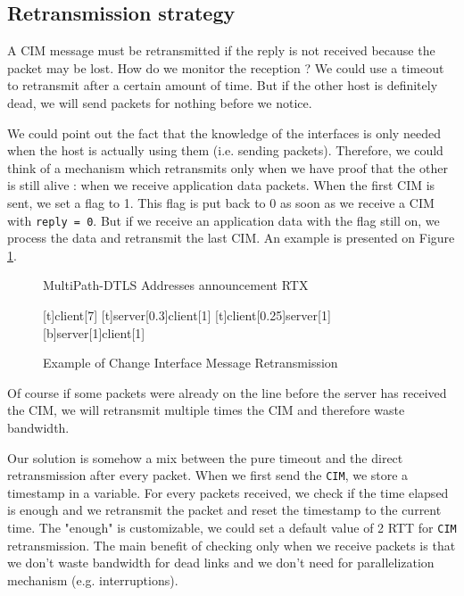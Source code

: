 \subsection{Retransmission strategy}


A CIM message must be retransmitted if the reply is not received because the packet may be lost. How do we monitor the reception ? We could use a timeout to retransmit after a certain amount of time. But if the other host is definitely dead, we will send packets for nothing before we notice.

We could point out the fact that the knowledge of the interfaces is only needed when the host is actually using them (i.e. sending packets). Therefore, we could think of a mechanism which retransmits only when we have proof that the other is still alive : when we receive application data packets. When the first CIM is sent, we set a flag to 1. This flag is put back to 0 as soon as we receive a CIM with \verb$reply = 0$. But if we receive an application data with the flag still on, we process the data and retransmit the last CIM. An example is presented on Figure \ref{fig:CIMexchange2}.

\begin{figure}[!h]
\centering
\begin{msc}[r]{MultiPath-DTLS Addresses announcement RTX}

\setlength{\instfootheight}{0em}
\setlength{\instheadheight}{0em}
\setlength{\instdist}{0.7\linewidth}
\setlength{\levelheight}{3em}


[t]{}{client}[7]
\nextlevel
{}[t]{server}[0.3]{client}[1]
\nextlevel
{}[t]{client}[0.25]{server}[1]
\nextlevel
{}[b]{server}[1]{client}[1]
\nextlevel
\nextlevel

\end{msc}
\caption{Example of Change Interface Message Retransmission}
\label{fig:CIMexchange2}
\end{figure}

Of course if some packets were already on the line before the server has received the CIM, we will retransmit multiple times the CIM and therefore waste bandwidth.

Our solution is somehow a mix between the pure timeout and the direct retransmission after every packet. When we first send the \verb!CIM!, we store a timestamp in a variable. For every packets received, we check if the time elapsed is enough and we retransmit the packet and reset the timestamp to the current time. The "enough" is customizable, we could set a default value of 2 RTT for \verb!CIM! retransmission. The main benefit of checking only when we receive packets is that we don't waste bandwidth for dead links and we don't need for parallelization mechanism (e.g. interruptions).

